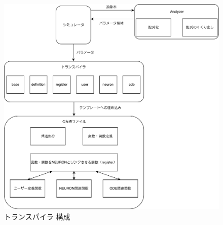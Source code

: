 \begin{figure}[htb]
  \begin{center}
    \includegraphics[width=1.1\textwidth]{./images/transpiler-image.pdf}
    \caption{トランスパイラ 構成}
    \label{fig:transpiler}
  \end{center}
\end{figure}~\\

\clearpage

